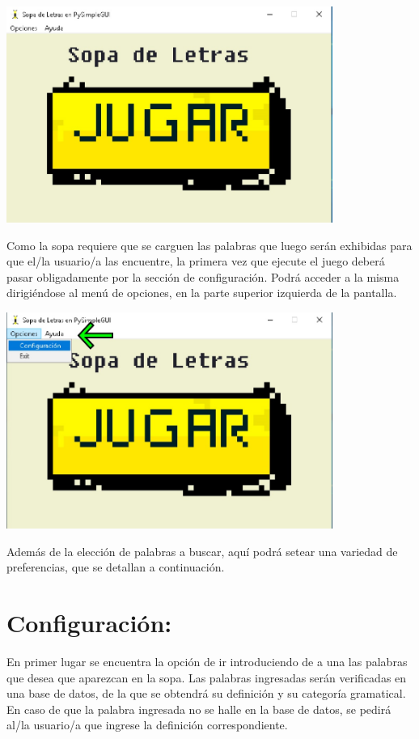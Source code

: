 \includegraphics[width=0.8\textwidth,keepaspectratio]{img/guia/1.jpg}

Como la sopa requiere que se carguen las palabras que luego serán exhibidas para que el/la usuario/a las encuentre, la primera vez que ejecute el juego deberá pasar obligadamente por la sección de configuración. Podrá acceder a la misma dirigiéndose al menú de opciones, en la parte superior izquierda de la pantalla. 

\includegraphics[width=0.8\textwidth,keepaspectratio]{img/guia/2.jpg}

Además de la elección de palabras a buscar, aquí podrá setear una variedad de preferencias, que se detallan a continuación.

\section{Configuración:}
En primer lugar se encuentra la opción de ir introduciendo de a una las palabras que desea que aparezcan en la sopa. Las palabras ingresadas serán verificadas en una base de datos, de la que se obtendrá su definición y su categoría gramatical. En caso de que la palabra ingresada no se halle en la base de datos, se pedirá al/la usuario/a que ingrese la definición correspondiente.


